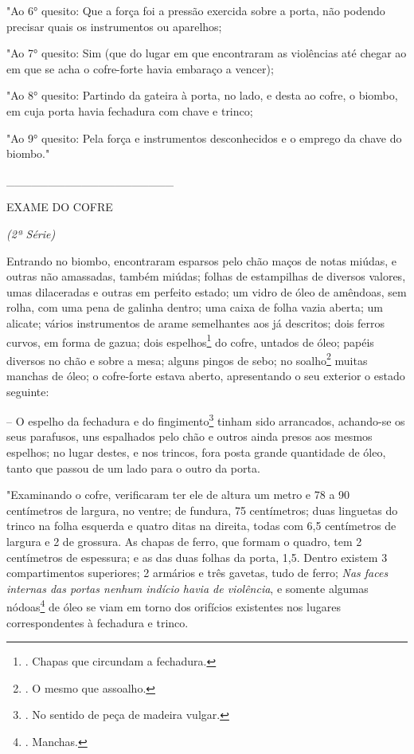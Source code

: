 "Ao 6° quesito: Que a força foi a pressão exercida sobre a porta, não
podendo precisar quais os instrumentos ou aparelhos;

"Ao 7° quesito: Sim (que do lugar em que encontraram as violências até
chegar ao em que se acha o cofre-forte havia embaraço a vencer);

"Ao 8° quesito: Partindo da gateira à porta, no lado, e desta ao cofre,
o biombo, em cuja porta havia fechadura com chave e trinco;

"Ao 9° quesito: Pela força e instrumentos desconhecidos e o emprego da
chave do biombo."

\_\_\_\_\_\_\_\_\_\_\_\_\_\_\_\_\_\_\_\_

EXAME DO COFRE

\emph{(2ª Série)}

Entrando no biombo, encontraram esparsos pelo chão maços de notas
miúdas, e outras não amassadas, também miúdas; folhas de estampilhas de
diversos valores, umas dilaceradas e outras em perfeito estado; um vidro
de óleo de amêndoas, sem rolha, com uma pena de galinha dentro; uma
caixa de folha vazia aberta; um alicate; vários instrumentos de arame
semelhantes aos já descritos; dois ferros curvos, em forma de gazua;
dois espelhos\footnote{. Chapas que circundam a fechadura.} do cofre,
untados de óleo; papéis diversos no chão e sobre a mesa; alguns pingos
de sebo; no soalho\footnote{. O mesmo que assoalho.} muitas manchas de
óleo; o cofre-forte estava aberto, apresentando o seu exterior o estado
seguinte:

-- O espelho da fechadura e do fingimento\footnote{. No sentido de peça
  de madeira vulgar.} tinham sido arrancados, achando-se os seus
parafusos, uns espalhados pelo chão e outros ainda presos aos mesmos
espelhos; no lugar destes, e nos trincos, fora posta grande quantidade
de óleo, tanto que passou de um lado para o outro da porta.

"Examinando o cofre, verificaram ter ele de altura um metro e 78 a 90
centímetros de largura, no ventre; de fundura, 75 centímetros; duas
linguetas do trinco na folha esquerda e quatro ditas na direita, todas
com 6,5 centímetros de largura e 2 de grossura. As chapas de ferro, que
formam o quadro, tem 2 centímetros de espessura; e as das duas folhas da
porta, 1,5. Dentro existem 3 compartimentos superiores; 2 armários e
três gavetas, tudo de ferro; \emph{Nas faces internas das portas nenhum
indício havia de violência}, e somente algumas nódoas\footnote{.
  Manchas.} de óleo se viam em torno dos orifícios existentes nos
lugares correspondentes à fechadura e trinco.

